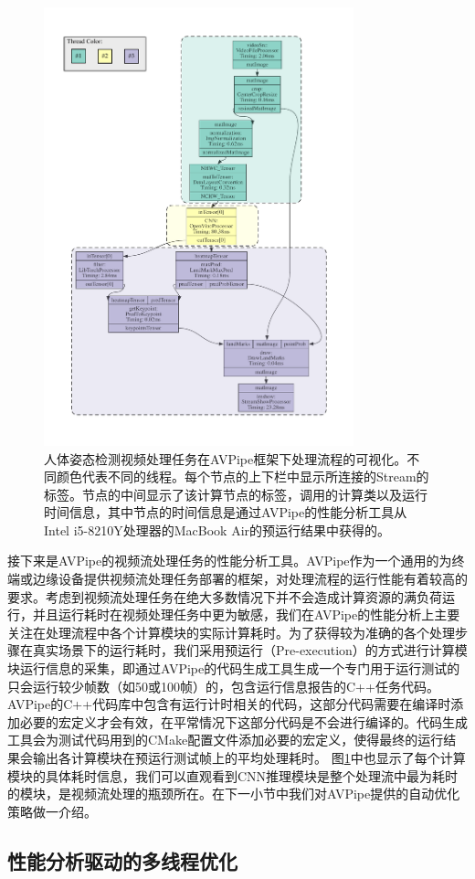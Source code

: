 \begin{figure}[tb]
    \centering
    \includegraphics[width=0.8\textwidth]{figure/AVP_pose_estimation.pdf}
    \caption[AVPipe可视化DAG流程图的示例]{人体姿态检测视频处理任务在AVPipe框架下处理流程的可视化。不同颜色代表不同的线程。每个节点的上下栏中显示所连接的Stream的标签。节点的中间显示了该计算节点的标签，调用的计算类以及运行时间信息，其中节点的时间信息是通过AVPipe的性能分析工具从Intel i5-8210Y处理器的MacBook Air的预运行结果中获得的。}
    \label{fig:pose_dag}
\end{figure}

接下来是AVPipe的视频流处理任务的性能分析工具。AVPipe作为一个通用的为终端或边缘设备提供视频流处理任务部署的框架，对处理流程的运行性能有着较高的要求。考虑到视频流处理任务在绝大多数情况下并不会造成计算资源的满负荷运行，并且运行耗时在视频处理任务中更为敏感，我们在AVPipe的性能分析上主要关注在处理流程中各个计算模块的实际计算耗时。为了获得较为准确的各个处理步骤在真实场景下的运行耗时，我们采用预运行（Pre-execution\cite{kim2002design}）的方式进行计算模块运行信息的采集，即通过AVPipe的代码生成工具生成一个专门用于运行测试的只会运行较少帧数（如50或100帧）的，包含运行信息报告的C++任务代码。AVPipe的C++代码库中包含有运行计时相关的代码，这部分代码需要在编译时添加必要的宏定义才会有效，在平常情况下这部分代码是不会进行编译的。代码生成工具会为测试代码用到的CMake配置文件添加必要的宏定义，使得最终的运行结果会输出各计算模块在预运行测试帧上的平均处理耗时。
图\ref{fig:pose_dag}中也显示了每个计算模块的具体耗时信息，我们可以直观看到CNN推理模块是整个处理流中最为耗时的模块，是视频流处理的瓶颈所在。在下一小节中我们对AVPipe提供的自动优化策略做一介绍。


\subsection{性能分析驱动的多线程优化}


